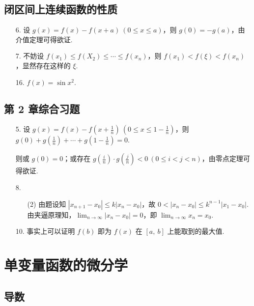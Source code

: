 \documentclass[oneside]{ctexbook} %
\begin{document}
\section{闭区间上连续函数的性质}

\begin{enumerate}
    \item[6.]
    设 $g(x) = f(x)-f(x+a) \ (0 \leqslant x \leqslant a)$，则 $g(0) = -g(a)$，由介值定理可得欲证.
    \item[7.]
    不妨设 $f(x_1) \leqslant f(X_2) \leqslant \cdots \leqslant f(x_n)$，则 $f(x_1) < f(\xi) < f(x_n)$，显然存在这样的 $\xi$.
    \item[16.]
    $f(x) = \sin x^2$.
\end{enumerate}

\section*{第 2 章综合习题}

\begin{enumerate}
    \item[5.]
    设 $g(x) = f(x) - f(x+\frac 1 n) \ (0 \leqslant x \leqslant 1 - \frac 1 n)$，则 $g(0) + g(\frac 1 n) + \cdots + g(1-\frac 1 n) = 0$.
    
    则或 $g(0) = 0$；或存在 $g\left( \frac i n \right) \cdot g\left( \frac j n \right) < 0 \ (0 \leqslant i < j < n)$，由零点定理可得欲证.
    \item[8.]
    \begin{enumerate}
        \item[(2)]
        由题设知 $|x_{n+1}-x_0| \le k |x_n-x_0|$，故 $0 < |x_n-x_0| \le k^{n-1}|x_1-x_0|$.
        由夹逼原理知，$\displaystyle\lim_{n \to \infty} |x_n-x_0| = 0$，即 $\displaystyle\lim_{n \to \infty} x_n = x_0$.
    \end{enumerate}
    \item[10.]
    事实上可以证明 $f(b)$ 即为 $f(x)$ 在 $[a,\ b]$ 上能取到的最大值.
\end{enumerate}

\newpage

\chapter{单变量函数的微分学}

\section{导数}
\end{document}
